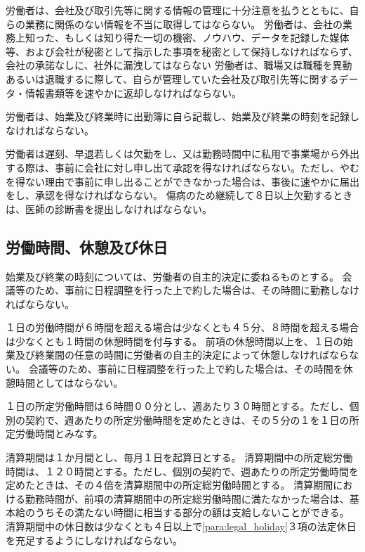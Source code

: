 \documentclass[10pt,a4paper,uplatex]{jsarticle}
\begin{document}
労働者は、会社及び取引先等に関する情報の管理に十分注意を払うとともに、自らの業務に関係のない情報を不当に取得してはならない。
\label{para:confidentiality}
\term
労働者は、会社の業務上知った、もしくは知り得た一切の機密、ノウハウ、データを記録した媒体等、および会社が秘密として指示した事項を秘密として保持しなければならず、会社の承諾なしに、社外に漏洩してはならない
\term
労働者は、職場又は職種を異動あるいは退職するに際して、自らが管理していた会社及び取引先等に関するデータ・情報書類等を速やかに返却しなければならない。

労働者は、始業及び終業時に出勤簿に自ら記載し、始業及び終業の時刻を記録しなければならない。

労働者は遅刻、早退若しくは欠勤をし、又は勤務時間中に私用で事業場から外出する際は、事前に会社に対し申し出て承認を得なければならない。ただし、やむを得ない理由で事前に申し出ることができなかった場合は、事後に速やかに届出をし、承認を得なければならない。
\term
傷病のため継続して８日以上欠勤するときは、医師の診断書を提出しなければならない。




\subsection{労働時間、休憩及び休日}

\label{para:time}
始業及び終業の時刻については、労働者の自主的決定に委ねるものとする。
\term
会議等のため、事前に日程調整を行った上で約した場合は、その時間に勤務しなければならない。

１日の労働時間が６時間を超える場合は少なくとも４５分、８時間を超える場合は少なくとも１時間の休憩時間を付与する。
\term
前項の休憩時間以上を、１日の始業及び終業間の任意の時間に労働者の自主的決定によって休憩しなければならない。
\term
会議等のため、事前に日程調整を行った上で約した場合は、その時間を休憩時間としてはならない。

\label{para:standardworktime}
１日の所定労働時間は６時間００分とし、週あたり３０時間とする。ただし、個別の契約で、週あたりの所定労働時間を定めたときは、その５分の１を１日の所定労働時間とみなす。

清算期間は１か月間とし、毎月１日を起算日とする。
\term
\label{para:totalworktime}
清算期間中の所定総労働時間は、１２０時間とする。ただし、個別の契約で、週あたりの所定労働時間を定めたときは、その４倍を清算期間中の所定総労働時間とする。
\term
清算期間における勤務時間が、前項の清算期間中の所定総労働時間に満たなかった場合は、基本給のうちその満たない時間に相当する部分の額は支給しないことができる。
\term
清算期間中の休日数は少なくとも４日以上で\ref{para:legal_holiday}３項の法定休日を充足するようにしなければならない。
\end{document}
